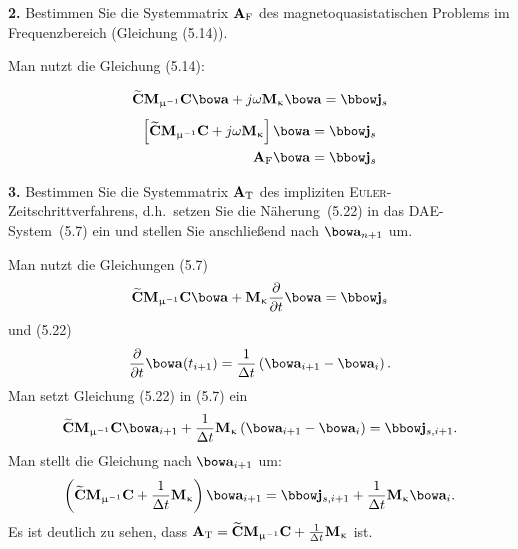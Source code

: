 \documentclass[Protokollheft.tex]{subfiles}
\begin{document}
\begin{framed}
	\noindent \textbf{2.} Bestimmen Sie die Systemmatrix $ \mathbf{A} _\text{F}$ des magnetoquasistatischen Problems im Frequenzbereich (Gleichung (5.14)).\label{exer:systemMatMQSF}
\end{framed}

Man nutzt die Gleichung (5.14):

$$ \curldfit\Mmui\curlfit\afit + j \omega\Mkap\afit = \jfit_{\boldmath{s}} $$
\begin{eqnarray*}
\left[ \curldfit\Mmui\curlfit + j \omega\Mkap \right]\afit = \jfit_{\boldmath{s}} \\
\Amat_\text{F}\afit=\jfit_{\boldmath{s}}
 \end{eqnarray*}
\begin{framed}
	\noindent \textbf{3.} Bestimmen Sie die Systemmatrix $ \mathbf{A} _\text{T}$ des impliziten
      \textsc{Euler}-Zeitschrittverfahrens, d.h.\ setzen Sie die Näherung~(5.22) in das DAE-System~(5.7) ein und stellen Sie anschließend nach $\afit_{n+1}$ um.\label{exer:systemMatMQST}
\end{framed}
\noindent
Man nutzt die Gleichungen (5.7)
$$ \curldfit\Mmui\curlfit\afit +           \Mkap      \frac{\partial }{\partial t}\afit = \jfit_{\boldmath{s}} $$
und (5.22)
$$ \frac{\partial }{\partial t}\afit(t_{i+1})=\frac{1}{\Delta t}\left(\afit_{i+1} - \afit_i\right).$$
Man setzt  Gleichung (5.22) in (5.7) ein
$$ \curldfit\Mmui\curlfit\afit_{i+1}+\frac{1}{\Delta t}\Mkap\left(\afit_{i+1} - \afit_i\right)= \jfit_{\boldmath{s},i+1}. $$
\noindent
Man stellt die Gleichung nach $\afit_{i+1}$ um:
$$ \left(\curldfit\Mmui\curlfit+\frac{1}{\Delta t}\Mkap\right)\afit_{i+1}= \jfit_{\boldmath{s},i+1}+\frac{1}{\Delta t}\Mkap\afit_i. $$
Es ist deutlich zu sehen, dass $ \mathbf{A} _\text{T} =\widetilde{\mathbf{C}}\mathbf{M}_{\upmu^{-1}}\mathbf{C}+\frac{1}{\Delta t}\mathbf{M}_{\upkappa} $ ist.
\end{document}
